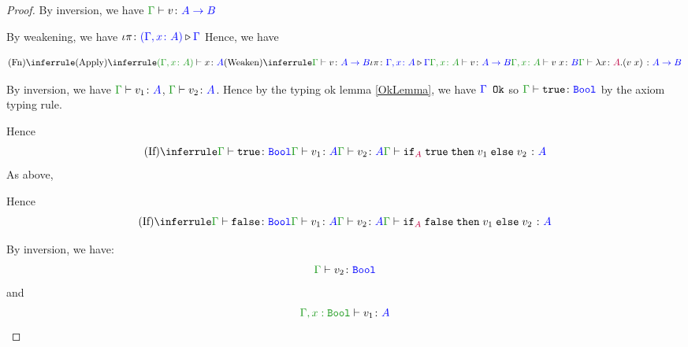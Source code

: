 \documentclass{report}
\begin{document}
\begin{framed}
\begin{proof}
            \case{\eqeta}
            By inversion, we have $\gtyperelation{v}{\ab}$
        
            By weakening, we have $\iota\pi \colon {\color{blue}(\Gamma, x\colon A)} \triangleright {\color {blue} \Gamma}$
            Hence, we have
        
            \begin{equation}
                \ntreeruleI{\vfun}{
                    \ntreeruleII{\vapply}{
                        \typerelation{(\gax)}{x}{A}
                    }{
                        \ntreeruleII{\vweaken}{
                            \gtyperelation{v}{\ab}
                        }{
                            \wrel{\i\pi}{\gax}{\G}
                        }{
                            \typerelation{\gax}{v}{\ab}
                        }
                    } {
                        \typerelation{\gax}{\apply{v}{x}}{B}
                    }
                }{\gtyperelation{\lam{x}{A}{(\apply{v}{x})}}{\ab}}
            \end{equation}
        
            \case{\eqiftrue}
                By inversion, we have $\gtyperelation{v_1}{ A}$, $\gtyperelation{v_2}{ A}$. Hence by the typing ok lemma \ref{OkLemma}, we have ${\color{blue} \Gamma} \texttt{ Ok}$ so $\gtyperelation{\t}{\B}$ by the axiom typing rule.
        
                Hence 
                \begin{equation}
                        \ntreeruleIII{\vif}{
                            \gtyperelation{\t}{\B}
                        }{
                            \gtyperelation{v_1}{ A}
                        }{
                            \gtyperelation{v_2}{ A}
                        }{
                            \gtyperelation{\pifthenelse{A}{\t}{v_1}{v_2}}{ A}
                        }
                \end{equation}
            \case{\eqiffalse}
            As above,
        
            Hence 
            \begin{equation}
                \ntreeruleIII{\vif}{
                    \gtyperelation{\f}{\B}
                }{
                    \gtyperelation{v_1}{ A}
                }{
                    \gtyperelation{v_2}{ A}
                }{
                    \gtyperelation{\pifthenelse{A}{\f}{v_1}{v_2}}{ A}
                }
        \end{equation}
        
        \case{\eqifeta}
            By inversion, we have:
            \begin{equation}
                \gtyperelation{v_2}{\B}
            \end{equation}
            and
            \begin{equation}
                \typerelation{\G, x:\B}{v_1}{ A}
            \end{equation}
            

\end{proof}
\end{framed}
\end{document}
